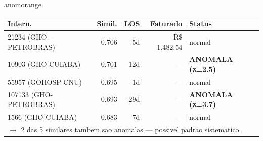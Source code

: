 \documentclass[a4paper,10pt]{article}
\begin{document}
\begin{anomalycard}[Internacao 159503 | GHO-PETROBRAS | ALTO (z=3.53)]{anomorange}
\begin{tabular}{l r r r l}\toprule\textbf{Intern.} & \textbf{Simil.} & \textbf{LOS} & \textbf{Faturado} & \textbf{Status} \\\midrule
21234 (GHO-PETROBRAS) & 0.706 & 5d & R\$ 1.482,54 & \textcolor{jcubeblue}{normal} \\
10903 (GHO-CUIABA) & 0.701 & 12d & --- & \textcolor{anomred}{\textbf{ANOMALA (z=2.5)}} \\
55957 (GOHOSP-CNU) & 0.695 & 1d & --- & \textcolor{jcubeblue}{normal} \\
107133 (GHO-PETROBRAS) & 0.693 & 29d & --- & \textcolor{anomred}{\textbf{ANOMALA (z=3.7)}} \\
1566 (GHO-CUIABA) & 0.683 & 7d & --- & \textcolor{jcubeblue}{normal} \\
\multicolumn{5}{l}{\textcolor{anomred}{\small $\rightarrow$ 2 das 5 similares tambem sao anomalas --- possivel padrao sistematico.}} \\
\bottomrule\end{tabular}



\end{anomalycard}

\newpage
\end{document}

